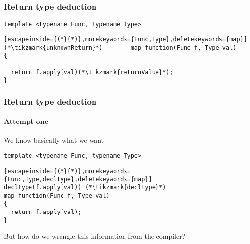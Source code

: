 \documentclass[14pt,a4paper,dvipsnames,usenames]{beamer}
\begin{document}
\begin{frame}[fragile]
  \frametitle{Return type deduction}

  \begin{lstlisting}
template <typename Func, typename Type>
  \end{lstlisting}
  \vspace*{-.2cm}
  \begin{lstlisting}[escapeinside={(*}{*)},morekeywords={Func,Type},deletekeywords={map}]
(*\tikzmark{unknownReturn}*)        map_function(Func f, Type val)
{

  return f.apply(val)(*\tikzmark{returnValue}*);
}
  \end{lstlisting}

  \nointerlineskip
   
\end{frame}

\begin{frame}[fragile]
  \frametitle{Return type deduction}
  \framesubtitle{Attempt one}

  We know basically what we want

  \vspace{.5cm}
  \begin{lstlisting}
template <typename Func, typename Type>
  \end{lstlisting}
  \vspace*{-.4cm}
  \begin{lstlisting}[escapeinside={(*}{*)},morekeywords={Func,Type,decltype},deletekeywords={map}]
decltype(f.apply(val)) (*\tikzmark{decltype}*)
map_function(Func f, Type val)
{
  return f.apply(val);
}
  \end{lstlisting}

  \vspace{.5cm}
  But how do we wrangle this information from the compiler?

   
\end{frame}
\end{document}
